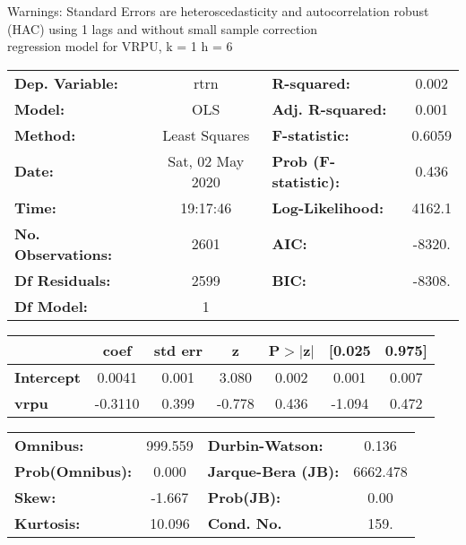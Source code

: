 Warnings: \newline
 [1] Standard Errors are heteroscedasticity and autocorrelation robust (HAC) using 1 lags and without small sample correction\\ 

regression model for VRPU, k = 1 h = 6\begin{center}
\begin{tabular}{lclc}
\toprule
\textbf{Dep. Variable:}    &       rtrn       & \textbf{  R-squared:         } &     0.002   \\
\textbf{Model:}            &       OLS        & \textbf{  Adj. R-squared:    } &     0.001   \\
\textbf{Method:}           &  Least Squares   & \textbf{  F-statistic:       } &    0.6059   \\
\textbf{Date:}             & Sat, 02 May 2020 & \textbf{  Prob (F-statistic):} &    0.436    \\
\textbf{Time:}             &     19:17:46     & \textbf{  Log-Likelihood:    } &    4162.1   \\
\textbf{No. Observations:} &        2601      & \textbf{  AIC:               } &    -8320.   \\
\textbf{Df Residuals:}     &        2599      & \textbf{  BIC:               } &    -8308.   \\
\textbf{Df Model:}         &           1      & \textbf{                     } &             \\
\bottomrule
\end{tabular}
\begin{tabular}{lcccccc}
                   & \textbf{coef} & \textbf{std err} & \textbf{z} & \textbf{P$> |$z$|$} & \textbf{[0.025} & \textbf{0.975]}  \\
\midrule
\textbf{Intercept} &       0.0041  &        0.001     &     3.080  &         0.002        &        0.001    &        0.007     \\
\textbf{vrpu}      &      -0.3110  &        0.399     &    -0.778  &         0.436        &       -1.094    &        0.472     \\
\bottomrule
\end{tabular}
\begin{tabular}{lclc}
\textbf{Omnibus:}       & 999.559 & \textbf{  Durbin-Watson:     } &    0.136  \\
\textbf{Prob(Omnibus):} &   0.000 & \textbf{  Jarque-Bera (JB):  } & 6662.478  \\
\textbf{Skew:}          &  -1.667 & \textbf{  Prob(JB):          } &     0.00  \\
\textbf{Kurtosis:}      &  10.096 & \textbf{  Cond. No.          } &     159.  \\
\bottomrule
\end{tabular}
\end{center}

